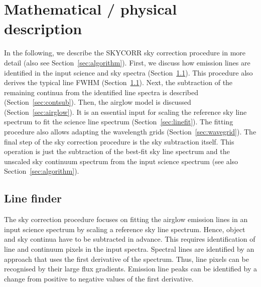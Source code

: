 \section{Mathematical / physical description}\label{sec:method}
In the following, we describe the SKYCORR sky correction procedure in more
detail (also see Section~\ref{sec:algorithm}). First, we discuss how emission
lines are identified in the input science and sky spectra
(Section~\ref{sec:linesearch}). This procedure also derives the typical line
FWHM (Section~\ref{sec:linesearch}). Next, the subtraction of the remaining
continua from the identified line spectra is described
(Section~\ref{sec:contsub}). Then, the airglow model is discussed
(Section~\ref{sec:airglow}). It is an essential input for scaling the
reference sky line spectrum to fit the science line spectrum
(Section~\ref{sec:linefit}). The fitting procedure also allows adapting the
wavelength grids (Section~\ref{sec:wavegrid}). The final step of the sky
correction procedure is the sky subtraction itself. This operation is just the
subtraction of the best-fit sky line spectrum and the unscaled sky continuum
spectrum from the input science spectrum (see also
Section~\ref{sec:algorithm}).

\subsection{Line finder}\label{sec:linesearch}
The sky correction procedure focuses on fitting the airglow emission lines in
an input science spectrum by scaling a reference sky line spectrum. Hence,
object and sky continua have to be subtracted in advance. This requires
identification of line and continuum pixels in the input spectra. Spectral
lines are identified by an approach that uses the first derivative of the
spectrum. Thus, line pixels can be recognised by their large flux gradients.
Emission line peaks can be identified by a change from positive to negative
values of the first derivative.

